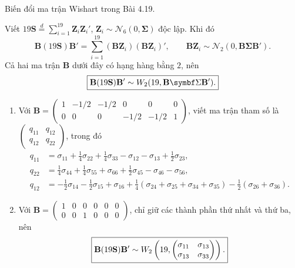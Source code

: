 \begin{problem}[Bài 4.20.]
Biến đổi ma trận Wishart trong Bài 4.19.
\end{problem}
\begin{solution}
Viết $19\mathbf S\stackrel d=\sum_{i=1}^{19}\mathbf Z_i\mathbf Z_i'$,
$\mathbf Z_i\sim\mathcal N_6(0,\boldsymbol\Sigma)$ độc lập. Khi đó
\[
\mathbf B(19\mathbf S)\mathbf B'=\sum_{i=1}^{19}
(\mathbf B\mathbf Z_i)(\mathbf B\mathbf Z_i)',\qquad
\mathbf B\mathbf Z_i\sim\mathcal N_2(0,\mathbf B\boldsymbol\Sigma\mathbf B').
\]
Cả hai ma trận $\mathbf B$ dưới đây có hạng hàng bằng $2$, nên
\[
\answer{\mathbf B(19\mathbf S)\mathbf B'\sim W_2(19,\mathbf B\boldsymbol\Sigma\mathbf B').}
\]
\begin{enumerate}[label=\textbf{\alph*)}]
\item Với
$\mathbf B=\begin{pmatrix}1&-1/2&-1/2&0&0&0\\0&0&0&-1/2&-1/2&1\end{pmatrix}$,
viết ma trận tham số là $\begin{pmatrix}q_{11}&q_{12}\\q_{12}&q_{22}\end{pmatrix}$, trong đó
\begin{align*}
q_{11}&=\sigma_{11}+\tfrac14\sigma_{22}+\tfrac14\sigma_{33}
-\sigma_{12}-\sigma_{13}+\tfrac12\sigma_{23},\\
q_{22}&=\tfrac14\sigma_{44}+\tfrac14\sigma_{55}+\sigma_{66}
+\tfrac12\sigma_{45}-\sigma_{46}-\sigma_{56},\\
q_{12}&=-\tfrac12\sigma_{14}-\tfrac12\sigma_{15}+\sigma_{16}
+\tfrac14(\sigma_{24}+\sigma_{25}+\sigma_{34}+\sigma_{35})
-\tfrac12(\sigma_{26}+\sigma_{36}).
\end{align*}
\item Với
$\mathbf B=\begin{pmatrix}1&0&0&0&0&0\\0&0&1&0&0&0\end{pmatrix}$,
chỉ giữ các thành phần thứ nhất và thứ ba, nên
\[
\boxed{\mathbf B(19\mathbf S)\mathbf B'\sim W_2\left(19,
\begin{pmatrix}\sigma_{11}&\sigma_{13}\\\sigma_{13}&\sigma_{33}\end{pmatrix}\right).}
\]
\end{enumerate}
\end{solution}

